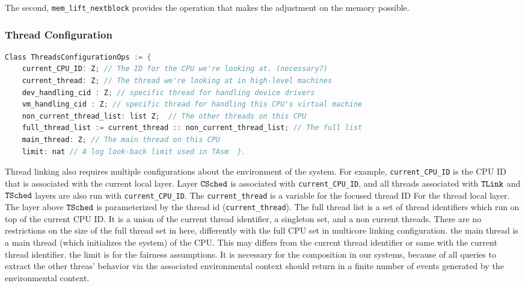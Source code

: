 The second, \lstinline$mem_lift_nextblock$ 
provides the operation that makes 
the adjustment on the memory possible. 


\subsubsection{Thread Configuration}
\begin{lstlisting}[language=C]
Class ThreadsConfigurationOps := {      
    current_CPU_ID: Z; // The ID for the CPU we're looking at. (necessary?) 
    current_thread: Z; // The thread we're looking at in high-level machines
    dev_handling_cid : Z; // specific thread for handling device drivers 
    vm_handling_cid : Z; // specific thread for handling this CPU's virtual machine 
    non_current_thread_list: list Z;  // The other threads on this CPU 
    full_thread_list := current_thread :: non_current_thread_list; // The full list
    main_thread: Z; // The main thread on this CPU 
    limit: nat // A log look-back limit used in TAsm  }.
\end{lstlisting}

Thread linking also requires multiple configurations about 
the environment of the system. 
For example, \lstinline$current_CPU_ID$ is the CPU ID that is 
associated with the current local layer.
Layer ${{\mathrm{\texttt{CSched}}}}$ is associated with \lstinline$current_CPU_ID$, 
and all threads associated with ${{\mathrm{\texttt{TLink}}}}$ and ${{\mathrm{\texttt{TSched}}}}$ layers 
are also run with  \lstinline$current_CPU_ID$.
The \lstinline$current_thread$ 
is a variable for the focused thread ID For the thread local layer. 
The layer above ${{\mathrm{\texttt{TSched}}}}$ is parameterized by the thread id (\lstinline$current_thread$). 
The full thread list is a set of thread identifiers 
which run on top of the current CPU ID. 
It is a union of the current thread identifier, a singleton set, 
and a non current threads. 
There are no restrictions on the size of the full thread set in here,
differently with the full CPU set in multicore linking configuration.
the main thread is a main thread (which initializes the system) of the CPU. 
This may differs from the current thread identifier or same with the current thread identifier.
the limit is for the fairness assumptions. 
It is necessary for the composition in our systems, 
because of all queries to extract the other threas' behavior via the associated environmental context 
should return in a finite number of events generated by the environmental context. 

